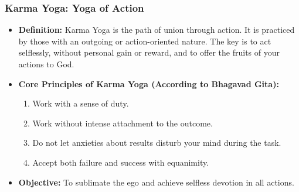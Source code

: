 \begin{frame}[fragile]\frametitle{Karma Yoga: Yoga of Action}
          \begin{itemize}
	  \item \textbf{Definition:} Karma Yoga is the path of union through action. It is practiced by those with an outgoing or action-oriented nature. The key is to act selflessly, without personal gain or reward, and to offer the fruits of your actions to God.

 
	  \item \textbf{Core Principles of Karma Yoga (According to Bhagavad Gita):}
    \begin{enumerate}
        \item Work with a sense of duty.
        \item Work without intense attachment to the outcome.
        \item Do not let anxieties about results disturb your mind during the task.
        \item Accept both failure and success with equanimity.
    \end{enumerate}

	  \item  \textbf{Objective:} To sublimate the ego and achieve selfless devotion in all actions.
	      \end{itemize}

\end{frame}

